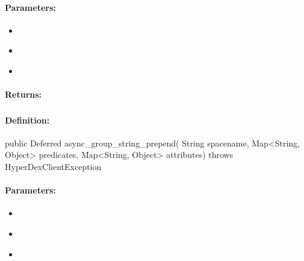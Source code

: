 \paragraph{Parameters:}
\begin{itemize}[noitemsep]
\item {}\\

\item {}\\

\item {}\\

\end{itemize}

\paragraph{Returns:}


\pagebreak
\subsubsection{}
\label{api:java:async_group_string_prepend}


\paragraph{Definition:}
\begin{javacode}
public Deferred async_group_string_prepend(
        String spacename,
        Map<String, Object> predicates,
        Map<String, Object> attributes) throws HyperDexClientException
\end{javacode}

\paragraph{Parameters:}
\begin{itemize}[noitemsep]
\item {}\\

\item {}\\

\item {}\\

\end{itemize}

